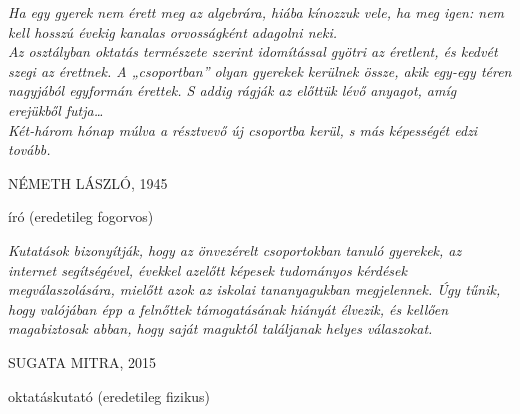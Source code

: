 \newlength\longest
\cleardoublepage
\thispagestyle{empty}
\null\vfill
{\centering
\parbox{0.8\textwidth} {%
    \raggedright{\large\itshape%
    Ha egy gyerek nem érett meg az algebrára, hiába kínozzuk vele,  
    ha meg igen: nem kell hosszú évekig kanalas orvosságként adagolni neki. \\
    Az osztályban oktatás természete szerint idomítással gyötri az éretlent, 
    és kedvét szegi az érettnek. A „csoportban'' olyan gyerekek kerülnek össze, akik egy-egy téren 
    nagyjából egyformán érettek. S addig rágják az előttük lévő anyagot, amíg erejükből futja\ldots\\ 
    Két-három hónap múlva a résztvevő új csoportba kerül, s más képességét edzi tovább.

        \par\bigskip
    }
    \raggedleft\Large\MakeUppercase{Németh László, 1945}\par%
    \raggedleft\normalsize{író (eredetileg fogorvos)}\par%
}\par%
}
\vfill\vfill
\bigskip
\null\vfill
{\centering
\parbox{0.8\textwidth} {%
    \raggedright{\large\itshape%
    Kutatások bizonyítják, hogy az önvezérelt csoportokban tanuló gyerekek, az internet segítségével, évekkel azelőtt képesek tudományos kérdések megválaszolására, mielőtt azok az iskolai tananyagukban megjelennek. Úgy tűnik, hogy valójában épp a felnőttek támogatásának hiányát élvezik, és kellően magabiztosak abban, hogy saját maguktól találjanak helyes válaszokat.

        \par\bigskip
    }
    \raggedleft\Large\MakeUppercase{Sugata Mitra, 2015}\par%
    \raggedleft\normalsize{oktatáskutató (eredetileg fizikus)}\par%
}\par%
}

\vfill\vfill
\clearpage

